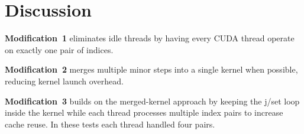 \documentclass{article}
\begin{document}
\section{Discussion}
\textbf{Modification~1} eliminates idle threads by having every CUDA thread operate on exactly one pair of indices.\par
\textbf{Modification~2} merges multiple minor steps into a single kernel when possible, reducing kernel launch overhead.\par
\textbf{Modification~3} builds on the merged-kernel approach by keeping the j/set loop inside the kernel while each thread processes multiple index pairs to increase cache reuse. In these tests each thread handled four pairs.
\end{document}
